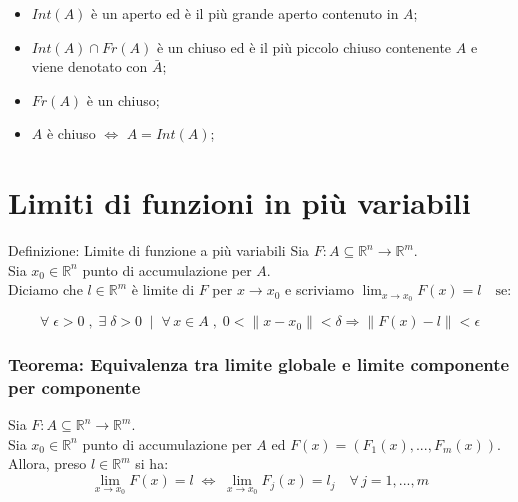 \documentclass[x11names]{article}
\begin{document}
	\begin{itemize}
		\item	\(Int(A)\) è un aperto ed è il più grande aperto contenuto in \(A\);
		\item   \(Int(A) \cap Fr(A)\) è un chiuso ed è il più piccolo chiuso contenente \(A\) e viene denotato con \(\bar{A}\);
		\item   \(Fr(A)\) è un chiuso;
		\item \(A\) è chiuso \(\Longleftrightarrow\) \(A = Int(A)\);
	\end{itemize}
	
	
	
	\section{Limiti di funzioni in più variabili}
	
	\begin{center}
		\colorbox{myblue}{\begin{minipage}{5.75in}
				\begin{blues}{Definizione: Limite di funzione a più variabili}
					Sia $F:A\subseteq\mathbb{R}^n \to \mathbb{R}^m.$\\
					
					Sia $x_0 \in \mathbb{R}^n$ punto di accumulazione per $A$.\\
					
					Diciamo che $l \in \mathbb{R}^m$ è limite di $F$ per $x\to x_0$ e scriviamo $\lim_{x\to x_0}F(x) = l \quad\text{se:}$
					
					\[
					\forall\; \epsilon > 0\;,\; \exists\; \delta > 0\;\;|\;\;\forall\,x \in A\;,\; 0 < \|x-x_0\| < \delta \Longrightarrow \|F(x)-l\|<\epsilon
					\]
				\end{blues}
		\end{minipage}}       
	\end{center}
	
	\begin{center}
		\colorbox{myred}{\begin{minipage}{5.75in}
				\begin{redes}{}
					\subsubsection{Teorema: Equivalenza tra limite globale e limite componente per componente}
					Sia $F:A\subseteq\mathbb{R}^n \to \mathbb{R}^m.$\\
					
					Sia $x_0 \in \mathbb{R}^n$ punto di accumulazione per $A$ ed $F(x) = (F_1(x),...,F_m(x)).$\\
					
					Allora, preso $l \in \mathbb{R}^m$ si ha: \\
					\[
					\lim_{x\to x_0} F(x) = l \; \Longleftrightarrow \; \lim_{x\to x_0} F_j(x)=l_j \quad \forall\,j=1,...,m
					\]
				\end{redes}
		\end{minipage}}
	\end{center}
	
\end{document}
